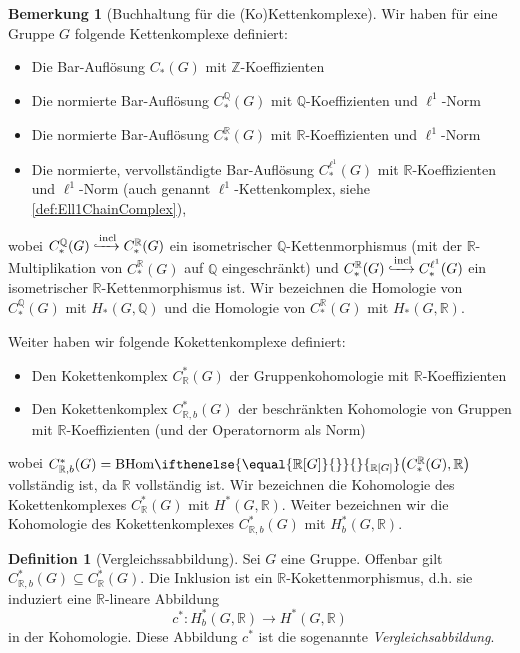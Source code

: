 \documentclass[a4paper,twoside,10pt]{scrreprt}
\newcommand{\Z}{\mathbb{Z}}
\newcommand{\Q}{\mathbb{Q}}
\newcommand{\R}{\mathbb{R}}
\newcommand{\BHom}[2][]{\text{BHom}%
\ifthenelse{\equal{#1}{}}{}{_{#1}}%
\bigl(#2\bigr)}%
\theoremstyle{definition}
\newtheorem{definition}[satz]{Definition}
\newtheorem{bemerkung}[satz]{Bemerkung}
\begin{document}
\begin{bemerkung}[Buchhaltung für die (Ko)Kettenkomplexe]
Wir haben für eine Gruppe $G$ folgende Kettenkomplexe definiert:
\begin{itemize}
\item Die Bar-Auflösung $C_*(G)$ mit $\Z$-Koeffizienten 
\item Die normierte Bar-Auflösung $C_*^{\Q}(G)$ mit $\Q$-Koeffizienten und $\ell^1$-Norm
\item Die normierte Bar-Auflösung $C_*^{\R}(G)$ mit $\R$-Koeffizienten und $\ell^1$-Norm
\item Die normierte, vervollständigte Bar-Auflösung $C_*^{\ell^1}(G)$ mit $\R$-Koeffizienten und $\ell^1$-Norm (auch genannt $\ell^1$-Kettenkomplex, siehe \cref{def:Ell1ChainComplex}),
\end{itemize}
wobei $C_*^{\Q}(G)\xhookrightarrow{\text{incl}}C_*^{\R}(G)$ ein isometrischer $\Q$-Kettenmorphismus (mit der $\R$-Multipli\-kation von $C_*^{\R}(G)$ auf $\Q$ eingeschränkt) und $C_*^{\R}(G)\xhookrightarrow{\text{incl}}C_*^{\ell^1}(G)$ ein isometrischer $\R$-Kettenmorphismus ist. Wir bezeichnen die Homologie von $C_*^{\Q}(G)$ mit $H_*(G,\Q)$ und die Homologie von $C_*^{\R}(G)$ mit $H_*(G,\R)$.\par
Weiter haben wir folgende Kokettenkomplexe definiert:
\begin{itemize}
\item Den Kokettenkomplex $C_{\R}^*(G)$ der Gruppenkohomologie mit $\R$-Koeffizienten
\item  Den Kokettenkomplex $C_{\R,b}^*(G)$ der beschränkten Kohomologie von Gruppen mit $\R$-Koef\-fizienten (und der Operatornorm als Norm)
\end{itemize}
wobei $C_{\R,b}^*(G)=\BHom[\R{[}G{]}]{C_*^{\R}(G),\R}$ vollständig ist, da $\R$ vollständig ist. Wir bezeichnen die Kohomologie des Kokettenkomplexes $C_{\R}^*(G)$ mit $H^*(G,\R)$. Weiter bezeichnen wir die Kohomologie des Kokettenkomplexes $C_{\R,b}^*(G)$ mit $H_b^*(G,\R)$.
\end{bemerkung}

\begin{definition}[Vergleichssabbildung]
Sei $G$ eine Gruppe.
Offenbar gilt $C_{\R,b}^*(G)\subseteq C_{\R}^*(G)$. Die Inklusion ist ein $\R$-Kokettenmorphismus, d.h. sie induziert eine $\R$-lineare Abbildung 
\begin{equation*}
c^*:H_b^*(G,\R)\to H^*(G,\R)
\end{equation*}
in der Kohomologie. Diese Abbildung $c^*$ ist die sogenannte \emph{Vergleichsabbildung}.
\end{definition}
\end{document}

